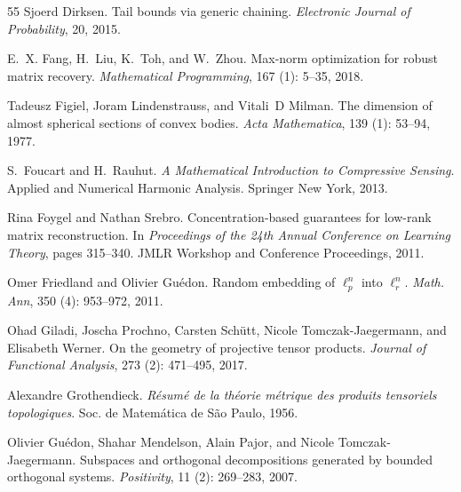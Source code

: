 \documentclass[11pt]{article}
\begin{document}
\begin{thebibliography}{55}
Sjoerd Dirksen.
\newblock Tail bounds via generic chaining.
\newblock \emph{Electronic Journal of Probability}, 20, 2015.

E.~X. Fang, H.~Liu, K.~Toh, and W.~Zhou.
\newblock Max-norm optimization for robust matrix recovery.
\newblock \emph{Mathematical Programming}, 167 (1): 5--35,
  2018.

Tadeusz Figiel, Joram Lindenstrauss, and Vitali~D Milman.
\newblock The dimension of almost spherical sections of convex bodies.
\newblock \emph{Acta Mathematica}, 139 (1): 53--94, 1977.

S.~Foucart and H.~Rauhut.
\newblock \emph{A Mathematical Introduction to Compressive Sensing}.
\newblock Applied and Numerical Harmonic Analysis. Springer New York, 2013.

Rina Foygel and Nathan Srebro.
\newblock Concentration-based guarantees for low-rank matrix reconstruction.
\newblock In \emph{Proceedings of the 24th Annual Conference on Learning
  Theory}, pages 315--340. JMLR Workshop and Conference Proceedings, 2011.

Omer Friedland and Olivier Gu{\'e}don.
\newblock Random embedding of $\ell^n_p$ into $\ell^n_r$.
\newblock \emph{Math. Ann}, 350 (4): 953--972, 2011.

Ohad Giladi, Joscha Prochno, Carsten Sch{\"u}tt, Nicole Tomczak-Jaegermann, and
  Elisabeth Werner.
\newblock On the geometry of projective tensor products.
\newblock \emph{Journal of Functional Analysis}, 273 (2):
  471--495, 2017.

Alexandre Grothendieck.
\newblock \emph{R{\'e}sum{\'e} de la th{\'e}orie m{\'e}trique des produits
  tensoriels topologiques}.
\newblock Soc. de Matem{\'a}tica de S{\~a}o Paulo, 1956.

Olivier Gu{\'e}don, Shahar Mendelson, Alain Pajor, and Nicole
  Tomczak-Jaegermann.
\newblock Subspaces and orthogonal decompositions generated by bounded
  orthogonal systems.
\newblock \emph{Positivity}, 11 (2): 269--283, 2007.


\end{thebibliography}
\end{document}
